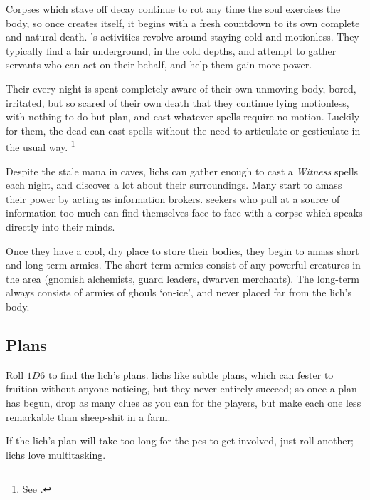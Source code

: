 \begin{multicols}{2}

\noindent
Corpses which stave off decay continue to rot any time the soul exercises the body, so once  creates itself, it begins with a fresh countdown to its own complete and natural death.
's activities revolve around staying cold and motionless.
They typically find a lair underground, in the cold depths, and attempt to gather servants who can act on their behalf, and help them gain more power.

Their every night is spent completely aware of their own unmoving body, bored, irritated, but so scared of their own death that they continue lying motionless, with nothing to do but plan, and cast whatever spells require no motion.
Luckily for them, the dead can cast spells without the need to articulate or gesticulate in the usual way.%
\footnote{See .}

Despite the stale mana in caves, \glspl{lich} can gather enough to cast a \textit{Witness} spells each night, and discover a lot about their surroundings.
Many start to amass their power by acting as information brokers.
\Glspl{seeker} who pull at a source of information too much can find themselves face-to-face with a corpse which speaks directly into their minds.

\lich

Once they have a cool, dry place to store their bodies, they begin to amass short and long term armies.
The short-term armies consist of any powerful creatures in the area (gnomish alchemists, \gls{guard} leaders, dwarven merchants).
The long-term always consists of armies of ghouls `on-ice', and never placed far from the \gls{lich}'s body.

\showStdSpells

\subsection{Plans}

Roll $1D6$ to find the \gls{lich}'s plans.
\Glspl{lich} like subtle plans, which can fester to fruition without anyone noticing, but they never entirely succeed; so once a plan has begun, drop as many clues as you can for the players, but make each one less remarkable than sheep-shit in a farm.

If the \gls{lich}'s plan will take too long for the \glspl{pc} to get involved, just roll another; \glspl{lich} love multitasking.


\end{multicols}
